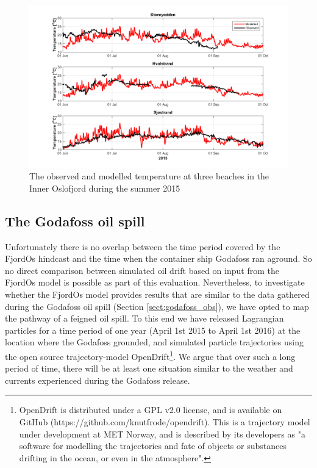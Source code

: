\begin{figure}[ht]
	\centerline{
		\includegraphics*[trim=0 0 0 0,clip=true,width=\textwidth]{Figurer/badetemp_2015}
		}
	\caption{\small The observed and modelled temperature at three beaches in the Inner Oslofjord during the summer 2015}
\label{fig:badetemp_2015}
\end{figure}


\clearpage 
\subsection{The Godafoss oil spill}
\label{sect:godafoss_model}
Unfortunately there is no overlap between the time period covered by the FjordOs hindcast and the time when the container ship Godafoss ran aground. So no direct comparison between simulated oil drift based on input from the FjordOs model is possible as part of this evaluation. Nevertheless, to investigate whether the FjordOs model provides results that are similar to the data gathered during the Godafoss oil spill (Section \ref{sect:godafoss_obs}), we have opted to map the pathway of a feigned oil spill. To this end we have released Lagrangian particles for a time period of one year (April 1st 2015 to April 1st 2016) at the location where the Godafoss grounded, and simulated particle trajectories using the open source trajectory-model OpenDrift\footnote{OpenDrift is distributed under a GPL v2.0 license, and is available on GitHub (https://github.com/knutfrode/opendrift). This is a trajectory model under development at MET Norway, and is described by its developers as "a software for modelling the trajectories and fate of objects or substances drifting in the ocean, or even in the atmosphere".}. We argue that over such a long period of time, there will be at least one situation similar to the weather and currents experienced during the Godafoss release.

